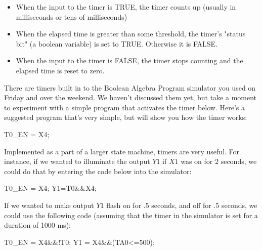 \documentclass[11pt]{article}
\providecommand{\tightlist}{%
      \setlength{\itemsep}{0pt}\setlength{\parskip}{0pt}}
\newenvironment{Shaded}{}{}
\newcommand{\DecValTok}[1]{\textcolor[rgb]{0.25,0.63,0.44}{{#1}}}
\newcommand{\NormalTok}[1]{{#1}}
\newcommand{\OperatorTok}[1]{\textcolor[rgb]{0.40,0.40,0.40}{{#1}}}
\begin{document}
\begin{itemize}
\tightlist
\item
  When the input to the timer is TRUE, the timer counts up (usually in
  milliseconds or tens of milliseconds)
\item
  When the elapsed time is greater than some threshold, the timer's
  "status bit" (a boolean variable) is set to TRUE. Otherwise it is
  FALSE.
\item
  When the input to the timer is FALSE, the timer stops counting and the
  elapsed time is reset to zero.
\end{itemize}

There are timers built in to the Boolean Algebra Program simulator you
used on Friday and over the weekend. We haven't discussed them yet, but
take a moment to experiment with a simple program that activates the
timer below. Here's a suggested program that's very simple, but will
show you how the timer works:

\begin{Shaded}
\begin{Highlighting}[]
\NormalTok{T0_EN }\OperatorTok{=}\NormalTok{ X4}\OperatorTok{;}
\end{Highlighting}
\end{Shaded}

Implemented as a part of a larger state machine, timers are very useful.
For instance, if we wanted to illuminate the output \(Y1\) if \(X1\) was
on for 2 seconds, we could do that by entering the code below into the
simulator:

\begin{Shaded}
\begin{Highlighting}[]
\NormalTok{T0_EN }\OperatorTok{=}\NormalTok{ X4}\OperatorTok{;}
\NormalTok{Y1}\OperatorTok{=}\NormalTok{T0}\OperatorTok{&&}\NormalTok{X4}\OperatorTok{;}
\end{Highlighting}
\end{Shaded}

If we wanted to make output \(Y1\) flash on for .5 seconds, and off for
.5 seconds, we could use the following code (assuming that the timer in
the simulator is set for a duration of 1000 ms):

\begin{Shaded}
\begin{Highlighting}[]
\NormalTok{T0_EN }\OperatorTok{=}\NormalTok{ X4}\OperatorTok{&&!}\NormalTok{T0}\OperatorTok{;}
\NormalTok{Y1 }\OperatorTok{=}\NormalTok{ X4}\OperatorTok{&&}\NormalTok{(TA0}\OperatorTok{<=}\DecValTok{500}\NormalTok{)}\OperatorTok{;}
\end{Highlighting}
\end{Shaded}
\end{document}
